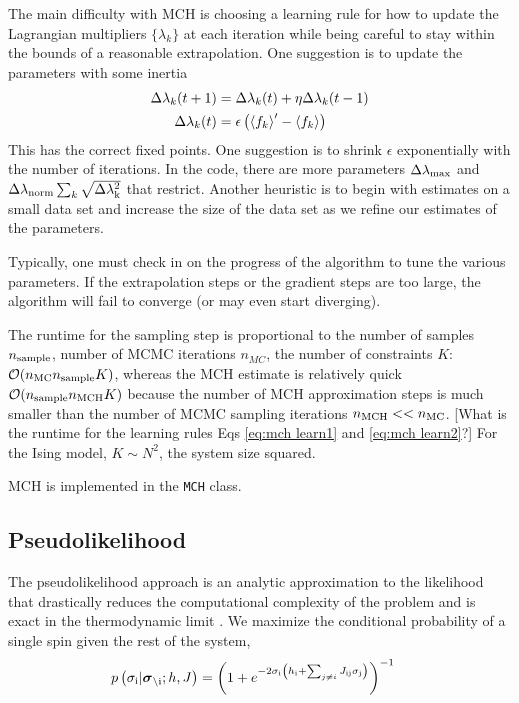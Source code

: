 \documentclass[aps,prl,twocolumn]{revtex4-1}
\begin{document}
The main difficulty with MCH is choosing a learning rule for how to update the Lagrangian multipliers $\{\lambda_k\}$ at each iteration while being careful to stay within the bounds of a reasonable extrapolation. One suggestion is to update the parameters with some inertia
\begin{align}
	\Delta\lambda_k(t+1) &= \Delta \lambda_k(t) + \eta \Delta\lambda_k(t-1)\label{eq:mch learn1}\\
	\Delta \lambda_k(t) &= \epsilon\left(\left<f_k\right>'-\left<f_k\right>\right)\label{eq:mch learn2}
\end{align}
This has the correct fixed points. One suggestion is to shrink $\epsilon$ exponentially with the number of iterations. In the code, there are more parameters $\Delta\lambda_{\rm max}$ and $\Delta\lambda_{\rm norm}\sum_k \sqrt{\Delta\lambda_{\rm k}^2}$ that restrict. Another heuristic is to begin with estimates on a small data set and increase the size of the data set as we refine our estimates of the parameters.

Typically, one must check in on the progress of the algorithm to tune the various parameters. If the extrapolation steps or the gradient steps are too large, the algorithm will fail to converge (or may even start diverging).

The runtime for the sampling step is proportional to the number of samples $n_{\rm sample}$, number of MCMC iterations $n_{MC}$, the number of constraints $K$:
$\mathcal{O}(n_{\rm MC} n_{\rm sample} K)$, whereas the MCH estimate is relatively quick $\mathcal{O}(n_{\rm sample}n_{\rm MCH}K)$ because the number of MCH approximation steps is much smaller than the number of MCMC sampling iterations $n_{\rm MCH}<<n_{\rm MC}$. [What is the runtime for the learning rules Eqs \ref{eq:mch learn1} and \ref{eq:mch learn2}?]
For the Ising model, $K\sim N^2$, the system size squared.

MCH is implemented in the {\tt MCH} class.

\subsection{Pseudolikelihood}
The pseudolikelihood approach is an analytic approximation to the likelihood that drastically reduces the computational complexity of the problem and is exact in the thermodynamic limit \cite{Aurell:2012hi}. We maximize the conditional probability of a single spin given the rest of the system,
\begin{align}
	p\left(\sigma_{\rm i}|\boldsymbol{\sigma}_{\backslash \rm i};h,J\right) &= \left( 1+e^{-2\sigma_{\rm i} \left(h_{\rm i}+\sum_{j\neq i}J_{\rm ij}\sigma_{\rm j}\right)} \right)^{-1}
\end{align}
\end{document}
